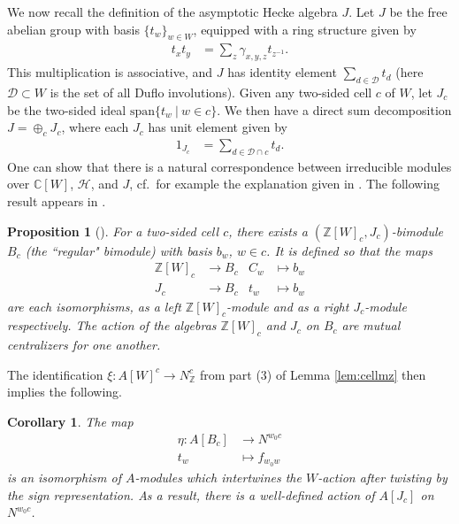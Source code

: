 \documentclass{amsart}
\newtheorem{corollary}[thm]{Corollary}
\newtheorem{prop}[thm]{Proposition}
\theoremstyle{definition}
\begin{document}
We now recall the definition of the asymptotic Hecke algebra $J$. Let $J$ be the free abelian group with basis $\{t_w\}_{w \in W}$, equipped with a ring structure given by
\begin{align}
    t_xt_y & = \sum_z \gamma_{x,y,z}t_{z^{-1}}.
\end{align}
This multiplication is associative, and $J$ has identity element $\sum_{d \in \mathcal{D}} t_d$ (here $\mathcal{D}\subset W$ is the set of all Duflo involutions). Given any two-sided cell $c$ of $W$, let $J_c$ be the two-sided ideal $\mathrm{span}\{t_w~|~w \in c\}$. We then have a direct sum decomposition $J = \oplus_{c} J_c$, where each $J_c$ has unit element given by
\begin{align}
    1_{J_c} & = \sum_{d \in \mathcal{D}\cap c} t_d.
\end{align}
One can show that there is a natural correspondence between irreducible modules over $\mathbb{C}[W]$, $\mathcal{H}$, and $J$, cf.\ for example the explanation given in \cite[Sections 8, 9]{WheresCurtis}. The following result appears in \cite{LCellsII}.

\begin{prop}[\cite{LCellsII}]\label{prop:bimodule}
    For a two-sided cell $c$, there exists a $(\mathbb{Z}[W]_c, J_c)$-bimodule $B_c$ (the ``regular" bimodule) with basis $b_w$, $w \in c$. It is defined so that the maps
    \begin{align}
        \mathbb{Z}[W]_c & \to B_c & C_w & \mapsto b_w\\
        J_c & \to B_c & t_w & \mapsto b_w
    \end{align}
    are each isomorphisms, as a left $\mathbb{Z}[W]_c$-module and as a right $J_c$-module respectively. The action of the algebras $\mathbb{Z}[W]_c$ and $J_c$ on $B_c$ are mutual centralizers for one another.
\end{prop}

The identification $\xi \colon  A[W]^c \to N_{\mathbb{Z}}^c$ from part (3) of Lemma \ref{lem:cellmz} then implies the following.
\begin{corollary}
The map
\begin{align*}
    \eta \colon  A[B_c] & \to N^{w_0c}\\
    t_w & \mapsto f_{w_0w}
\end{align*}
is an isomorphism of $A$-modules which intertwines the $W$-action after twisting by the sign representation. As a result, there is a well-defined action of $A[J_c]$ on $N^{w_0c}$.
\end{corollary}
\end{document}
